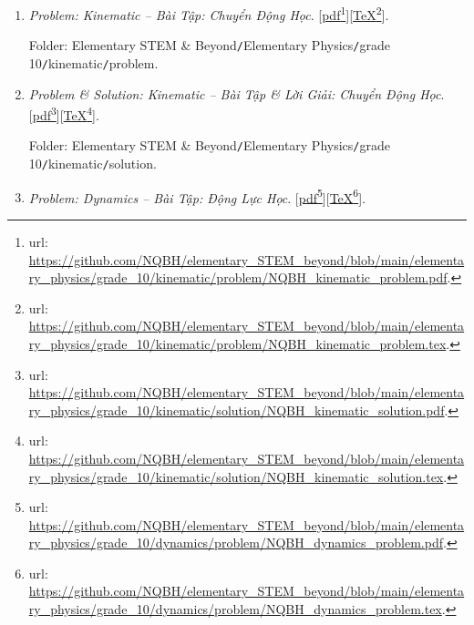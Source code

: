 \documentclass[12pt,twoside]{book}
\begin{document}
\begin{enumerate}
	\item {\it Problem: Kinematic -- Bài Tập: Chuyển Động Học}. [\href{https://github.com/NQBH/elementary_STEM_beyond/blob/main/elementary_physics/grade_10/kinematic/problem/NQBH_kinematic_problem.pdf}{pdf}\footnote{{\sc url}: \url{https://github.com/NQBH/elementary_STEM_beyond/blob/main/elementary_physics/grade_10/kinematic/problem/NQBH_kinematic_problem.pdf}.}][\href{https://github.com/NQBH/elementary_STEM_beyond/blob/main/elementary_physics/grade_10/kinematic/problem/NQBH_kinematic_problem.tex}{\TeX}\footnote{{\sc url}: \url{https://github.com/NQBH/elementary_STEM_beyond/blob/main/elementary_physics/grade_10/kinematic/problem/NQBH_kinematic_problem.tex}.}].
	
	Folder: {\sf Elementary STEM \& Beyond{\tt/}Elementary Physics{\tt/}grade 10{\tt/}kinematic{\tt/}problem}.
	
	\item {\it Problem \& Solution: Kinematic -- Bài Tập \& Lời Giải: Chuyển Động Học}. [\href{https://github.com/NQBH/elementary_STEM_beyond/blob/main/elementary_physics/grade_10/kinematic/solution/NQBH_kinematic_solution.pdf}{pdf}\footnote{{\sc url}: \url{https://github.com/NQBH/elementary_STEM_beyond/blob/main/elementary_physics/grade_10/kinematic/solution/NQBH_kinematic_solution.pdf}.}][\href{https://github.com/NQBH/elementary_STEM_beyond/blob/main/elementary_physics/grade_10/kinematic/solution/NQBH_kinematic_solution.tex}{\TeX}\footnote{{\sc url}: \url{https://github.com/NQBH/elementary_STEM_beyond/blob/main/elementary_physics/grade_10/kinematic/solution/NQBH_kinematic_solution.tex}.}].
	
	Folder: {\sf Elementary STEM \& Beyond{\tt/}Elementary Physics{\tt/}grade 10{\tt/}kinematic{\tt/}solution}.
	\item {\it Problem: Dynamics -- Bài Tập: Động Lực Học}. [\href{https://github.com/NQBH/elementary_STEM_beyond/blob/main/elementary_physics/grade_10/dynamics/problem/NQBH_dynamics_problem.pdf}{pdf}\footnote{{\sc url}: \url{https://github.com/NQBH/elementary_STEM_beyond/blob/main/elementary_physics/grade_10/dynamics/problem/NQBH_dynamics_problem.pdf}.}][\href{https://github.com/NQBH/elementary_STEM_beyond/blob/main/elementary_physics/grade_10/dynamics/problem/NQBH_dynamics_problem.tex}{\TeX}\footnote{{\sc url}: \url{https://github.com/NQBH/elementary_STEM_beyond/blob/main/elementary_physics/grade_10/dynamics/problem/NQBH_dynamics_problem.tex}.}].
	

\end{enumerate}
\end{document}

